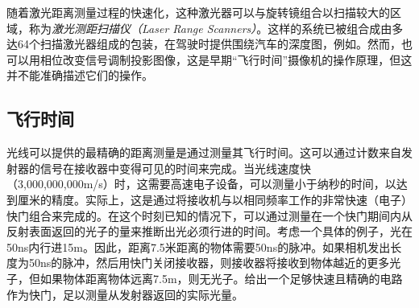 随着激光距离测量过程的快速化，这种激光器可以与旋转镜组合以扫描较大的区域，称为\emph{激光测距扫描仪（Laser Range Scanners）}。这样的系统已被组合成由多达64个扫描激光器组成的包装，在驾驶时提供围绕汽车的深度图，例如。然而，也可以用相位改变信号调制投影图像，这是早期“飞行时间”摄像机的操作原理，但这并不能准确描述它们的操作。




\subsection{飞行时间}
光线可以提供的最精确的距离测量是通过测量其飞行时间。这可以通过计数来自发射器的信号在接收器中变得可见的时间来完成。当光线速度快（3,000,000,000m/s）时，这需要高速电子设备，可以测量小于纳秒的时间，以达到厘米的精度。实际上，这是通过将接收机与以相同频率工作的非常快速（电子）快门组合来完成的。在这个时刻已知的情况下，可以通过测量在一个快门期间内从反射表面返回的光子的量来推断出光必须行进的时间。考虑一个具体的例子，光在50ns内行进15m。因此，距离7.5米距离的物体需要50ns的脉冲。如果相机发出长度为50ns的脉冲，然后用快门关闭接收器，则接收器将接收到物体越近的更多光子，但如果物体距离物体远离7.5m，则无光​​子。给出一个足够快速且精确的电路作为快门，足以测量从发射器返回的实际光量。


